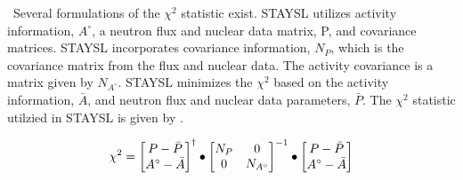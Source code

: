 \ Several formulations of the $\chi^{2}$ statistic exist. STAYSL utilizes activity information, $A^{\circ}$, a neutron flux and nuclear data matrix, P, and covariance matrices. STAYSL incorporates covariance information, $N_{P}$, which is the covariance matrix from the flux and nuclear data. The activity covariance is a matrix given by $N_{A^{\circ}}$. STAYSL minimizes the $\chi^{2}$ based on the activity information, $\bar{A}$, and neutron flux and nuclear data parameters, $\bar{P}$. The $\chi^{2}$ statistic utilzied in STAYSL is given by \cite{Perey1977}. 
	
\begin{equation} \label{eq:LeastSqSTAYSL}
\chi^{2} = \begin{bmatrix}
P-\bar{P} \\
A^{\circ}-\bar{A}    
\end{bmatrix}^{\dagger}
\space 
\bullet
\space 
\begin{bmatrix}
N_{P}  &  0      \\
0  &  N_{A^{\circ}}     
\end{bmatrix}^{-1}
\space
\bullet
\space
\begin{bmatrix}
P-\bar{P} \\
A^{\circ}-\bar{A}    
\end{bmatrix}
\end{equation} 


 
